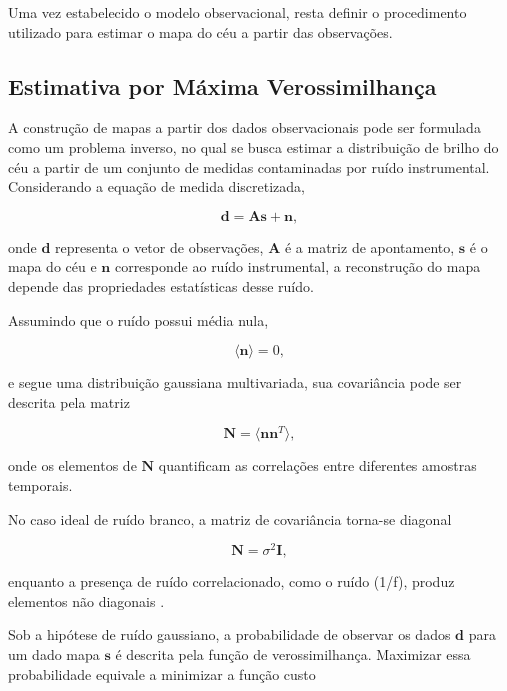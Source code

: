 Uma vez estabelecido o modelo observacional, resta definir o procedimento utilizado para estimar o mapa do céu a partir das observações.

\subsection{Estimativa por Máxima Verossimilhança}

A construção de mapas a partir dos dados observacionais pode ser formulada como um problema inverso, no qual se busca estimar a distribuição de brilho do céu a partir de um conjunto de medidas contaminadas por ruído instrumental. Considerando a equação de medida discretizada,

\begin{equation}
\mathbf d=\mathbf A\mathbf s+\mathbf n,
\label{eq:medida_discretizada}
\end{equation}

onde $\mathbf d$ representa o vetor de observações, $\mathbf A$ é a matriz de apontamento, $\mathbf s$ é o mapa do céu e $\mathbf n$ corresponde ao ruído instrumental, a reconstrução do mapa depende das propriedades estatísticas desse ruído.

Assumindo que o ruído possui média nula,

\begin{equation}
\langle \mathbf n \rangle = 0,
\end{equation}

e segue uma distribuição gaussiana multivariada, sua covariância pode ser descrita pela matriz

\begin{equation}
\mathbf N =
\langle
\mathbf n \mathbf n^{T}
\rangle,
\label{Matriz_covariancia}
\end{equation}

onde os elementos de $\mathbf N$ quantificam as correlações entre diferentes amostras temporais. 


No caso ideal de ruído branco, a matriz de covariância torna-se diagonal


\begin{equation}
\mathbf N=\sigma^2\mathbf I,
\end{equation}

enquanto a presença de ruído correlacionado, como o ruído (1/f), produz elementos não diagonais \cite{tegmark1997mapmaking,delabrouille2013psm}.

Sob a hipótese de ruído gaussiano, a probabilidade de observar os dados $\mathbf d$ para um dado mapa $\mathbf s$ é descrita pela função de verossimilhança. Maximizar essa probabilidade equivale a minimizar a função custo


